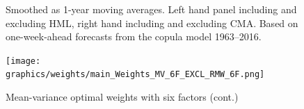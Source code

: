 \begin{figure}[htbp]
  \begin{longcaption}
    Smoothed as 1-year moving averages. Left hand panel including and excluding HML, right hand including and excluding CMA. Based on one-week-ahead forecasts from the copula model 1963--2016.
  \end{longcaption}
\end{figure}

\begin{figure}[htbp]
  \ContinuedFloat
  \centering
  \texttt{[image: graphics/weights/main\_Weights\_MV\_6F\_EXCL\_RMW\_6F.png]}
  \footnotesize
  \caption{Mean-variance optimal weights with six factors (cont.)}
\end{figure}



